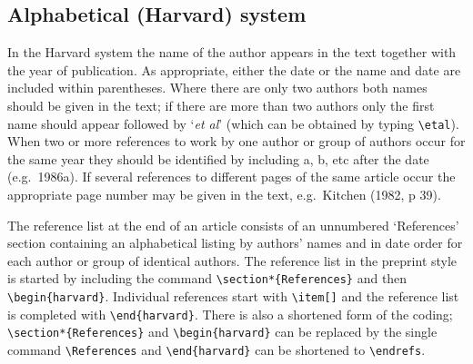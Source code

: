 \documentclass[12pt]{iopart}
\begin{document}
\subsection{Alphabetical (Harvard) system}
In the Harvard system the name of the author appears in the text together 
with the year of publication. As appropriate, either the date or the name 
and date are included within parentheses. Where there are only two authors 
both names should be given in the text; if there are more than two 
authors only the first name should appear followed by `{\it et al}' 
(which can be obtained by typing \verb"\etal"). When two or 
more references to work by one author or group of authors occur for the 
same year they should be identified by including a, b, etc after the date 
(e.g.\ 1986a). If several references to different pages of the same article 
occur the appropriate page number may be given in the text, e.g.\ Kitchen 
(1982, p 39).

The reference list at the end of an article consists of an 
unnumbered `References' section containing an
alphabetical listing by authors' names and in date order for each 
author or group of identical authors. The reference list in the 
preprint style is started by including the command \verb"\section*{References}" and then
\verb"\begin{harvard}".
Individual references start with \verb"\item[]" and the reference list is completed with \verb"\end{harvard}".
There is also a shortened form of the coding; \verb"\section*{References}"
and \verb"\begin{harvard}" can be replaced by the single command
\verb"\References" and \verb"\end{harvard}" can be shortened to
\verb"\endrefs".
\end{document}

